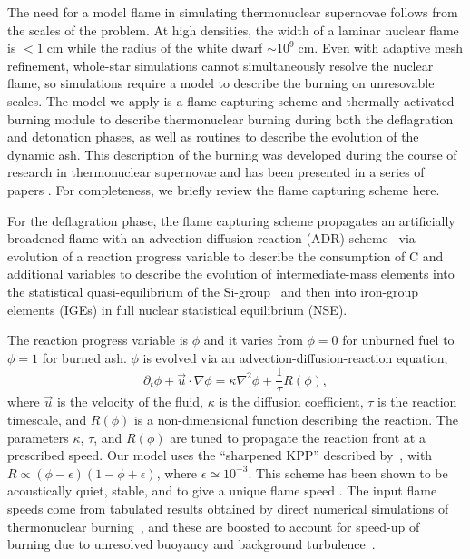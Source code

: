 \documentclass[iop,apj]{emulateapj}
\newcommand{\pv}{\ensuremath{\phi}}
\begin{document}
The need for a model flame in simulating thermonuclear supernovae follows
from the scales of the problem. At high densities, the width of a laminar
nuclear flame is $< 1\ensuremath{\;}{\ensuremath{\mathrm{cm}}}$ while the
radius of the white dwarf $\sim 10^9\ensuremath{\;}{\ensuremath{\mathrm{cm}}}$.
Even with adaptive mesh refinement, whole-star simulations cannot
simultaneously resolve the nuclear flame, so simulations require a model to
describe the burning on unresovable scales.  The model we apply is a flame
capturing scheme and thermally-activated burning module to describe
thermonuclear burning during both the deflagration and detonation phases,
as well as routines to describe the evolution of the dynamic ash.
This description of the burning was developed during the course of research in
thermonuclear supernovae and has been presented in a series of
papers \citep[See][and references therein]{chandlery}. For completeness,
we briefly review the flame capturing scheme here.

For the deflagration phase, the flame capturing scheme propagates an
artificially broadened flame with an advection-diffusion-reaction (ADR)
scheme~\citep{Khok95,VladWeirRyzh06} via evolution of
a reaction progress variable to describe the consumption of C
and additional variables to describe the evolution of intermediate-mass
elements into the statistical quasi-equilibrium of the
Si-group~\citep{ifk1981,khok1981,khok1983} and then into iron-group elements
(IGEs) in full nuclear statistical equilibrium (NSE).

The reaction progress variable is $\phi$ and it varies from $\phi=0$ for
unburned fuel to $\phi=1$ for burned ash. $\phi$ is evolved
via an advection-diffusion-reaction equation,
\begin{equation}
  \label{eq:ard}
  \partial_t \pv + \vec{u}\cdot\nabla \pv = \kappa \nabla^2 \pv +
\frac{1}{\tau} R\left(\phi\right) ,
\end{equation}
where $\vec{u}$ is the velocity of the fluid, $\kappa$ is the
diffusion coefficient, $\tau$ is the reaction timescale, and $R(\phi)$ is
a non-dimensional function describing the reaction. The parameters
$\kappa$, $\tau$, and $R(\phi)$ are tuned to propagate the reaction
front at a prescribed speed.  Our model uses the ``sharpened KPP''
 described by~\cite{VladWeirRyzh06},
with $R\propto(\phi-\epsilon)(1-\phi+\epsilon)$, where
$\epsilon \simeq 10^{-3}$.  This scheme has been shown to be
acoustically quiet, stable, and to give a unique flame speed
\citep{townsley.calder.ea:flame}. The input flame speeds come from
tabulated results obtained by direct numerical simulations of
thermonuclear burning~\citep{timmes92,Chamulak2007The-Laminar-Fla},
and
these are boosted to account for speed-up of burning due to unresolved
buoyancy and background turbulence~\citep{Khok95,
gamezo.khokhlov.ea:thermonuclear,townsley.calder.ea:flame,jacketal2014}.
\end{document}
